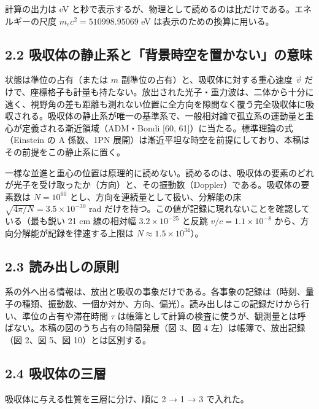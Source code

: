 \documentclass[
  a4paper,
]{ltjsarticle}
\begin{document}
計算の出力は eV
と秒で表示するが、物理として読めるのは比だけである。エネルギーの尺度
\(m_ec^2=510998.95069\) eV は表示のための換算に用いる。

\subsection{2.2
吸収体の静止系と「背景時空を置かない」の意味}\label{ux5438ux53ceux4f53ux306eux9759ux6b62ux7cfbux3068ux80ccux666fux6642ux7a7aux3092ux7f6eux304bux306aux3044ux306eux610fux5473}

状態は準位の占有（または \(m\) 副準位の占有）と、吸収体に対する重心速度
\(\vec v\)
だけで、座標格子も計量も持たない。放出された光子・重力波は、二体から十分に遠く、視野角の差も距離も測れない位置に全方向を隙間なく覆う完全吸収体に吸収される。吸収体の静止系が唯一の基準系で、一般相対論で孤立系の運動量と重心が定義される漸近領域（ADM・Bondi
{[}60, 61{]}）に当たる。標準理論の式（Einstein の A 係数、1PN
展開）は漸近平坦な時空を前提にしており、本稿はその前提をこの静止系に置く。

一様な並進と重心の位置は原理的に読めない。読めるのは、吸収体の要素のどれが光子を受け取ったか（方向）と、その振動数（Doppler）である。吸収体の要素数は
\(N=10^{60}\) とし、方向を連続量として扱い、分解能の床
\(\sqrt{4\pi/N}=3.5\times10^{-30}\) rad
だけを持つ。この値が記録に現れないことを確認している（最も鋭い 21 cm
線の相対幅 \(3.2\times10^{-25}\) と反跳 \(v/c=1.1\times10^{-8}\)
から、方向分解能が記録を律速する上限は \(N\approx1.5\times10^{34}\)）。

\subsection{2.3
読み出しの原則}\label{ux8aadux307fux51faux3057ux306eux539fux5247}

系の外へ出る情報は、放出と吸収の事象だけである。各事象の記録は（時刻、量子の種類、振動数、一個か対か、方向、偏光）。読み出しはこの記録だけから行い、準位の占有や滞在時間
\(\tau\)
は帳簿として計算の検査に使うが、観測量とは呼ばない。本稿の図のうち占有の時間発展（図
3、図 4 左）は帳簿で、放出記録（図 2、図 5、図 10）とは区別する。

\subsection{2.4
吸収体の三層}\label{ux5438ux53ceux4f53ux306eux4e09ux5c64}

吸収体に与える性質を三層に分け、順に 2 → 1 → 3 で入れた。
\end{document}
